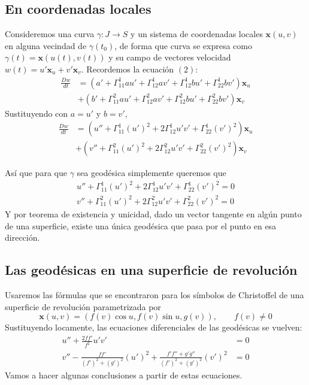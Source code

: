 \documentclass[spanish]{book}
\theoremstyle{definition}
\begin{document}
\subsection{En coordenadas locales}
Consideremos una curva $\gamma: J\to S$ y un sistema de coordenadas locales $\mathbf x(u,v)$ en alguna vecindad de $\gamma(t_0)$, de forma que curva se expresa como $\gamma(t)=\mathbf x(u(t),v(t))$ y su campo de vectores velocidad $w(t)=u'\mathbf x_u +v'\mathbf x_v$. Recordemos la ecuación $(2)$:
\begin{equation*}
	\begin{aligned}
		\frac{Dw}{dt}&=(a'+\Gamma^1_{11}au'+\Gamma^1_{12}av'+\Gamma^1_{12}bu'+\Gamma^1_{22}bv')\mathbf x_u\\
		&+(b'+\Gamma^2_{11}au'+\Gamma^2_{12}av'+\Gamma^2_{12}bu'+\Gamma^2_{22}bv')\mathbf x_v
	\end{aligned}
\end{equation*}
Sustituyendo con $a=u'$ y $b=v'$,
\begin{equation*}
	\begin{aligned}
		\frac{Dw}{dt}&=(u''+\Gamma^1_{11}(u')^2+2\Gamma^1_{12}u'v'+\Gamma^1_{22}(v')^2)\mathbf x_u\\
		&+(v''+\Gamma^2_{11}(u')^2+2\Gamma^2_{12}u'v'+\Gamma^2_{22}(v')^2)\mathbf x_v
	\end{aligned}
\end{equation*}

Así que para que $\gamma$ sea geodésica simplemente queremos que 
\begin{equation*}
	\begin{aligned}
		u''+\Gamma^1_{11}(u')^2+2\Gamma^1_{12}u'v'+\Gamma^1_{22}(v')^2=0\\
		v''+\Gamma^2_{11}(u')^2+2\Gamma^2_{12}u'v'+\Gamma^2_{22}(v')^2=0
	\end{aligned}
\end{equation*}
Y por teorema de existencia y unicidad, dado un vector tangente en algún punto de una superficie, existe una única geodésica que pasa por el punto en esa dirección.

\subsection{Las geodésicas en una superficie de revolución}
Usaremos las fórmulas que se encontraron para los símbolos de Christoffel de una superficie de revolución parametrizada por
\[\mathbf x(u,v)=(f(v)\cos u,f(v)\sin u,g(v)),\qquad f(v)\neq0\]
Sustituyendo locamente, las ecuaciones diferenciales de las geodésicas se vuelven:
\begin{align*}
	u''+\frac{2ff'}{f^2}u'v'&=0\\
	v''-\frac{ff'}{(f')^2+(g')^2}(u')^2+\frac{f'f''+g'g''}{(f')^2+(g')^2}(v')^2&=0
\end{align*}
Vamos a hacer algunas conclusiones a partir de estas ecuaciones.
\end{document}
